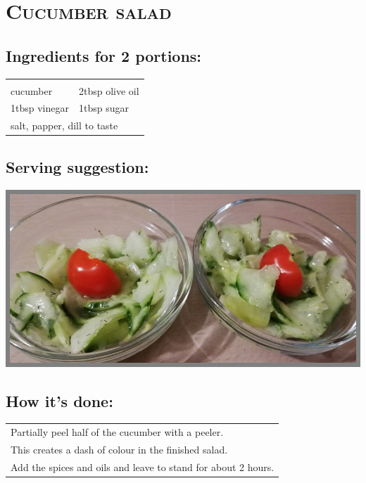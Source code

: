 \section{\textsc{Cucumber salad}}

\subsection*{Ingredients for 2 portions:}

\begin{tabular}{p{7.5cm} p{7.5cm}}
	& \\
	\sfrac{1}{2} cucumber & 2tbsp olive oil \\
	1tbsp vinegar & 1tbsp sugar \\
	\multicolumn{2}{l}{salt, papper, dill to taste}
\end{tabular}

\subsection*{Serving suggestion:}

\includegraphics[width=\textwidth]{img/gurkensalat.jpg} \cite{gurkensalat}

\subsection*{How it's done:}

\begin{tabular}{p{15cm}}
	\\
  Partially peel half of the cucumber with a peeler.\\
  This creates a dash of colour in the finished salad.\\
  Add the spices and oils and leave to stand for about 2 hours.
\end{tabular}
